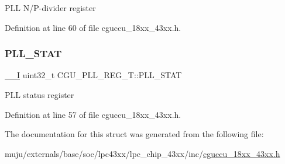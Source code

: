 P\+LL N/\+P-\/divider register 

Definition at line 60 of file cguccu\+\_\+18xx\+\_\+43xx.\+h.

\mbox{\label{struct_c_g_u___p_l_l___r_e_g___t_ae0ecd7bd027d8befd5feadd3ec410c52}} 
\subsubsection{\texorpdfstring{P\+L\+L\+\_\+\+S\+T\+AT}{PLL\_STAT}}
{\footnotesize\ttfamily \hyperlink{core__sc300_8h_af63697ed9952cc71e1225efe205f6cd3}{\+\_\+\+\_\+I} uint32\+\_\+t C\+G\+U\+\_\+\+P\+L\+L\+\_\+\+R\+E\+G\+\_\+\+T\+::\+P\+L\+L\+\_\+\+S\+T\+AT}

P\+LL status register 

Definition at line 57 of file cguccu\+\_\+18xx\+\_\+43xx.\+h.



The documentation for this struct was generated from the following file\+:\begin{DoxyCompactItemize}
\item 
muju/externals/base/soc/lpc43xx/lpc\+\_\+chip\+\_\+43xx/inc/\hyperlink{cguccu__18xx__43xx_8h}{cguccu\+\_\+18xx\+\_\+43xx.\+h}\end{DoxyCompactItemize}

